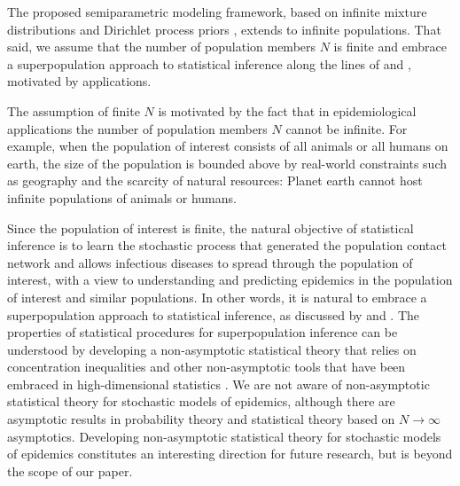 The proposed semiparametric modeling framework,
based on infinite mixture distributions and Dirichlet process priors \citep{Fe73,Teh2007},
extends to infinite populations.
That said,
we assume that the number of population members $N$ is finite and embrace a superpopulation approach to statistical inference along the lines of \citet{hartley1975super} and \citet*{ScKrBu17},
motivated by applications.

The assumption of finite $N$ is motivated by the fact that in epidemiological applications the number of population members $N$ cannot be infinite.
For example,
when the population of interest consists of all animals or all humans on earth,
the size of the population is bounded above by real-world constraints such as geography and the scarcity of natural resources:
Planet earth cannot host infinite populations of animals or humans.

Since the population of interest is finite,
the natural objective of statistical inference is to learn the stochastic process that generated the population contact network and allows infectious diseases to spread through the population of interest,
with a view to understanding and predicting epidemics in the population of interest and similar populations.
In other words,
it is natural to embrace a superpopulation approach to statistical inference,
as discussed by \citet{hartley1975super} and \citet{ScKrBu17}.
The properties of statistical procedures for superpopulation inference can be understood by developing a non-asymptotic statistical theory that relies on concentration inequalities and other non-asymptotic tools that have been embraced in high-dimensional statistics \citep[see, e.g.,][]{Wa19}.
We are not aware of non-asymptotic statistical theory for stochastic models of epidemics,
although there are asymptotic results in probability theory \citep*[e.g.,][]{Re95,BrLiTu11,BaRe13,PaPa20,Ba21} and statistical theory \citep[e.g.,][]{Br98,Br01a} based on $N \to \infty$ asymptotics.
Developing non-asymptotic statistical theory for stochastic models of epidemics constitutes an interesting direction for future research,
but is beyond the scope of our paper.
